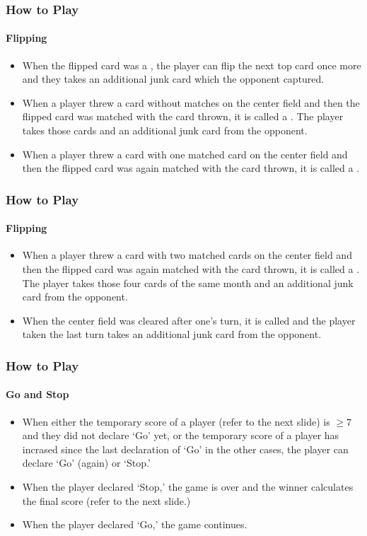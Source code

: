 \begin{frame}[fragile]
  \frametitle{How to Play}
  \framesubtitle{Flipping}

  \begin{itemize}
    \item When the flipped card was a , the player can flip the next top card once more and they takes an additional junk card which the opponent captured.
    \item When a player threw a card without matches on the center field and then the flipped card was matched with the card thrown, it is called a . The player takes those cards and an additional junk card from the opponent.
    \item When a player threw a card with one matched card on the center field and then the flipped card was again matched with the card thrown, it is called a .
  \end{itemize}
\end{frame}

\begin{frame}[fragile]
  \frametitle{How to Play}
  \framesubtitle{Flipping}

  \begin{itemize}
    \item When a player threw a card with two matched cards on the center field and then the flipped card was again matched with the card thrown, it is called a . The player takes those four cards of the same month and an additional junk card from the opponent.
    \item When the center field was cleared after one's turn, it is called  and the player taken the last turn takes an additional junk card from the opponent.
  \end{itemize}
\end{frame}

\begin{frame}[fragile]
  \frametitle{How to Play}
  \framesubtitle{Go and Stop}

  \begin{itemize}
    \item When either the temporary score of a player (refer to the next slide) is $\ge 7$ and they did not declare `Go' yet, or the temporary score of a player has incrased since the last declaration of `Go' in the other cases, the player can declare `Go' (again) or `Stop.'
    \item When the player declared `Stop,' the game is over and the winner calculates the final score (refer to the next slide.)
    \item When the player declared `Go,' the game continues.
  \end{itemize}
\end{frame}


